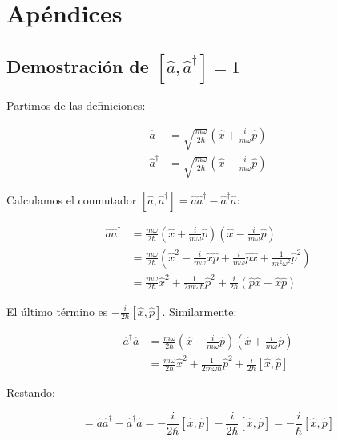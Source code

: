 \documentclass[11pt,a4paper,spanish]{book}
\begin{document}
	
	\appendix
	\chapter{Apéndices}

	
\section{Demostración de $[\hat{a}, \hat{a}^\dagger] = 1$} \label{sec:born1925}


Partimos de las definiciones:

\begin{align}
	\hat{a} &= \sqrt{\frac{m\omega}{2\hbar}}\left(\hat{x} + \frac{i}{m\omega}\hat{p}\right) \\
	\hat{a}^\dagger &= \sqrt{\frac{m\omega}{2\hbar}}\left(\hat{x} - \frac{i}{m\omega}\hat{p}\right)
\end{align}

Calculamos el conmutador $[\hat{a}, \hat{a}^\dagger] = \hat{a}\hat{a}^\dagger - \hat{a}^\dagger\hat{a}$:

\begin{align}
	\hat{a}\hat{a}^\dagger &= \frac{m\omega}{2\hbar}\left(\hat{x} + \frac{i}{m\omega}\hat{p}\right)\left(\hat{x} - \frac{i}{m\omega}\hat{p}\right) \\
	&= \frac{m\omega}{2\hbar}\left(\hat{x}^2 - \frac{i}{m\omega}\hat{x}\hat{p} + \frac{i}{m\omega}\hat{p}\hat{x} + \frac{1}{m^2\omega^2}\hat{p}^2\right) \\
	&= \frac{m\omega}{2\hbar}\hat{x}^2 + \frac{1}{2m\omega\hbar}\hat{p}^2 + \frac{i}{2\hbar}(\hat{p}\hat{x} - \hat{x}\hat{p})
\end{align}

El último término es $-\frac{i}{2\hbar}[\hat{x}, \hat{p}]$. Similarmente:

\begin{align}
	\hat{a}^\dagger\hat{a} &= \frac{m\omega}{2\hbar}\left(\hat{x} - \frac{i}{m\omega}\hat{p}\right)\left(\hat{x} + \frac{i}{m\omega}\hat{p}\right) \\
	&= \frac{m\omega}{2\hbar}\hat{x}^2 + \frac{1}{2m\omega\hbar}\hat{p}^2 + \frac{i}{2\hbar}[\hat{x}, \hat{p}]
\end{align}

Restando:

\begin{equation}
	[\hat{a}, \hat{a}^\dagger] = \hat{a}\hat{a}^\dagger - \hat{a}^\dagger\hat{a} = -\frac{i}{2\hbar}[\hat{x}, \hat{p}] - \frac{i}{2\hbar}[\hat{x}, \hat{p}] = -\frac{i}{\hbar}[\hat{x}, \hat{p}]
\end{equation}
\end{document}
